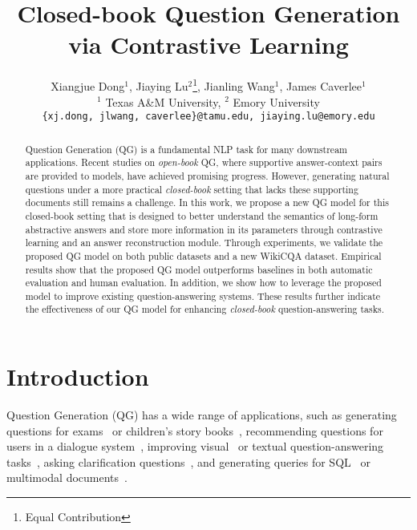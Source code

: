 \documentclass[11pt]{article}
\title{Closed-book Question Generation via Contrastive Learning}
\author{Xiangjue Dong$^1$, Jiaying Lu$^2$\thanks{\hspace{0.2cm}Equal Contribution}, Jianling Wang$^1$\footnotemark[1], James Caverlee$^1$\\
        $^1$ Texas A\&M University, $^2$ Emory University \\ \small\texttt{\{xj.dong, jlwang, caverlee\}@tamu.edu, jiaying.lu@emory.edu}}
\begin{document}
\maketitle
\begin{abstract}

Question Generation (QG) is a fundamental NLP task for many downstream applications. Recent studies on \textit{open-book} QG, where supportive answer-context pairs are provided to models, have achieved promising progress.
However, generating natural questions under a more practical \textit{closed-book} setting that lacks these supporting documents still remains a challenge.
In this work, we propose a new QG model for this closed-book setting that is designed to better understand the semantics of long-form abstractive answers and store more information in its parameters through contrastive learning and an answer reconstruction module.
Through experiments, we validate the proposed QG model on both public datasets and a new WikiCQA dataset. Empirical results show that the proposed QG model outperforms baselines in both automatic evaluation and human evaluation.
In addition, we show how to leverage the proposed model to improve existing question-answering systems. These results further indicate the effectiveness of our QG model for enhancing \textit{closed-book} question-answering tasks.













\end{abstract}

\section{Introduction}

Question Generation (QG) has a wide range of applications, such as generating questions for exams~\cite{jia-etal-2021-eqg, lelkes2021quiz, dugan2022feasibility} or children's story books~\cite{zhao-etal-2022-educational, Yao2022ItIA}, recommending questions for users in a dialogue system~\cite{shukla-etal-2019-ask, laban-etal-2020-whats}, improving visual~\cite{Li_2018_CVPR,lu2022good} or textual question-answering tasks~\cite{duan-etal-2017-question, lewis2019unsupervised, zhang2019addressing, sultan-etal-2020-importance, lyu-etal-2021-improving}, asking clarification questions~\cite{rao-daume-iii-2019-answer, yu-etal-2020-interactive, ren-etal-2021}, and generating queries for SQL~\cite{wu2021data} or multimodal documents~\cite{kim-etal-2021-query}.
\end{document}
